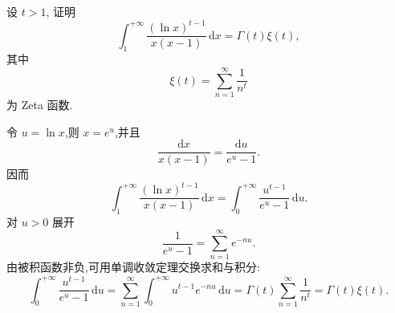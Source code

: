 \begin{example}[\markstar]
    设 $t>1$, 证明
    \[
        \displaystyle\int_1^{+\infty}\dfrac{(\ln x)^{t-1}}{x(x-1)}\,\mathrm{d}x
        =\Gamma(t)\xi(t),
    \]
    其中
    \[
        \xi(t)=\sum\limits_{n=1}^{\infty}\dfrac{1}{n^t}
    \]
    为 Zeta 函数.
\end{example}
\exampleblank

\begin{solution}
    令 $u=\ln x$,则 $x=e^u$,并且
    \[
        \dfrac{\mathrm{d}x}{x(x-1)}=\dfrac{\mathrm{d}u}{e^u-1}.
    \]
    因而
    \[
        \displaystyle\int_1^{+\infty}\dfrac{(\ln x)^{t-1}}{x(x-1)}\,\mathrm{d}x
        =\int_0^{+\infty}\dfrac{u^{t-1}}{e^u-1}\,\mathrm{d}u.
    \]
    对 $u>0$ 展开
    \[
        \dfrac{1}{e^u-1}=\sum\limits_{n=1}^{\infty}e^{-nu}.
    \]
    由被积函数非负,可用单调收敛定理交换求和与积分:
    \[
        \displaystyle\int_0^{+\infty}\dfrac{u^{t-1}}{e^u-1}\,\mathrm{d}u
        =\sum\limits_{n=1}^{\infty}\int_0^{+\infty}u^{t-1}e^{-nu}\,\mathrm{d}u
        =\Gamma(t)\sum\limits_{n=1}^{\infty}\dfrac{1}{n^t}
        =\Gamma(t)\xi(t).
    \]
\end{solution}
